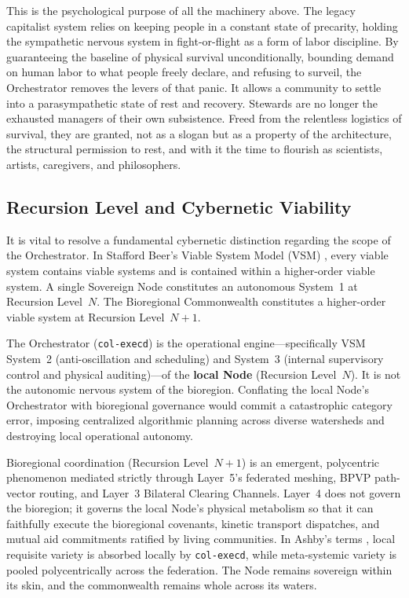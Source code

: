 This is the psychological purpose of all the machinery above. The legacy capitalist system relies on keeping people in a constant state of precarity, holding the sympathetic nervous system in fight-or-flight as a form of labor discipline. By guaranteeing the baseline of physical survival unconditionally, bounding demand on human labor to what people freely declare, and refusing to surveil, the Orchestrator removes the levers of that panic. It allows a community to settle into a parasympathetic state of rest and recovery. Stewards are no longer the exhausted managers of their own subsistence. Freed from the relentless logistics of survival, they are granted, not as a slogan but as a property of the architecture, the structural permission to rest, and with it the time to flourish as scientists, artists, caregivers, and philosophers.

\subsection{Recursion Level and Cybernetic Viability}

It is vital to resolve a fundamental cybernetic distinction regarding the scope of the Orchestrator. In Stafford Beer's Viable System Model (VSM) \parencite{beer1972,beer1974}, every viable system contains viable systems and is contained within a higher-order viable system. A single Sovereign Node constitutes an autonomous System~1 at Recursion Level~$N$. The Bioregional Commonwealth constitutes a higher-order viable system at Recursion Level~$N+1$.

The Orchestrator (\texttt{col-execd}) is the operational engine—specifically VSM System~2 (anti-oscillation and scheduling) and System~3 (internal supervisory control and physical auditing)—of the \textbf{local Node} (Recursion Level~$N$). It is not the autonomic nervous system of the bioregion. Conflating the local Node's Orchestrator with bioregional governance would commit a catastrophic category error, imposing centralized algorithmic planning across diverse watersheds and destroying local operational autonomy.

Bioregional coordination (Recursion Level~$N+1$) is an emergent, polycentric phenomenon mediated strictly through Layer~5's federated meshing, BPVP path-vector routing, and Layer~3 Bilateral Clearing Channels. Layer~4 does not govern the bioregion; it governs the local Node's physical metabolism so that it can faithfully execute the bioregional covenants, kinetic transport dispatches, and mutual aid commitments ratified by living communities. In Ashby's terms \parencite{ashby1956}, local requisite variety is absorbed locally by \texttt{col-execd}, while meta-systemic variety is pooled polycentrically across the federation. The Node remains sovereign within its skin, and the commonwealth remains whole across its waters.
